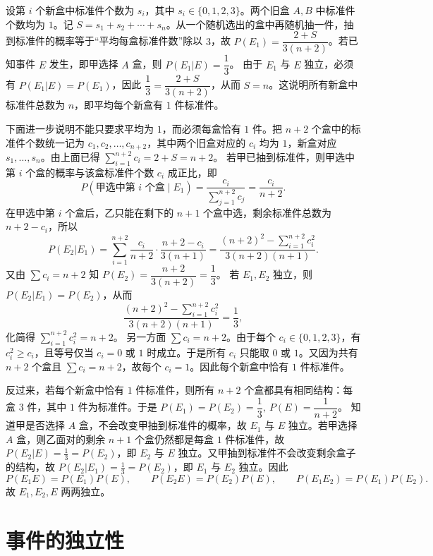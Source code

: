 \documentclass[lang=cn,11pt]{elegantbook}
\begin{document}
\begin{solution}
设第 \(i\) 个新盒中标准件个数为 \(s_i\)，其中 \(s_i\in\{0,1,2,3\}\)。两个旧盒 \(A,B\) 中标准件个数均为 \(1\)。记 \(S=s_1+s_2+\cdots+s_n\)。从一个随机选出的盒中再随机抽一件，抽到标准件的概率等于“平均每盒标准件数”除以 \(3\)，故 \(P(E_1)=\dfrac{2+S}{3(n+2)}\)。若已知事件 \(E\) 发生，即甲选择 \(A\) 盒，则 \(P(E_1|E)=\dfrac13\)。
由于 \(E_1\) 与 \(E\) 独立，必须有 \(P(E_1|E)=P(E_1)\)，因此
 \(\dfrac13=\dfrac{2+S}{3(n+2)}\)，从而 \(S=n\)。这说明所有新盒中标准件总数为 \(n\)，即平均每个新盒有 \(1\) 件标准件。

下面进一步说明不能只要求平均为 \(1\)，而必须每盒恰有 \(1\) 件。把 \(n+2\) 个盒中的标准件个数统一记为 \(c_1,c_2,\dots,c_{n+2}\)，其中两个旧盒对应的 \(c_i\) 均为 \(1\)，新盒对应 \(s_1,\dots,s_n\)。由上面已得 \(\sum_{i=1}^{n+2}c_i=2+S=n+2\)。
若甲已抽到标准件，则甲选中第 \(i\) 个盒的概率与该盒标准件个数 \(c_i\) 成正比，即
\[
P(\text{甲选中第 }i\text{ 个盒}\mid E_1)
=\frac{c_i}{\sum_{j=1}^{n+2}c_j}
=\frac{c_i}{n+2}.
\]
在甲选中第 \(i\) 个盒后，乙只能在剩下的 \(n+1\) 个盒中选，剩余标准件总数为 \(n+2-c_i\)，所以
\[
P(E_2|E_1)
=\sum_{i=1}^{n+2}\frac{c_i}{n+2}\cdot
\frac{n+2-c_i}{3(n+1)}
=\frac{(n+2)^2-\sum_{i=1}^{n+2}c_i^2}{3(n+2)(n+1)}.
\]
又由 \(\sum c_i=n+2\) 知 \(P(E_2)=\dfrac{n+2}{3(n+2)}=\dfrac13\)。
若 \(E_1,E_2\) 独立，则 \(P(E_2|E_1)=P(E_2)\)，从而
\[
\frac{(n+2)^2-\sum_{i=1}^{n+2}c_i^2}{3(n+2)(n+1)}
=\frac13,
\]
化简得 \(\sum_{i=1}^{n+2}c_i^2=n+2\)。
另一方面 \(\sum c_i=n+2\)。由于每个 \(c_i\in\{0,1,2,3\}\)，有 \(c_i^2\ge c_i\)，且等号仅当 \(c_i=0\) 或 \(1\) 时成立。于是所有 \(c_i\) 只能取 \(0\) 或 \(1\)。又因为共有 \(n+2\) 个盒且 \(\sum c_i=n+2\)，故每个 \(c_i=1\)。因此每个新盒中恰有 \(1\) 件标准件。

反过来，若每个新盒中恰有 \(1\) 件标准件，则所有 \(n+2\) 个盒都具有相同结构：每盒 \(3\) 件，其中 \(1\) 件为标准件。于是 \(P(E_1)=P(E_2)=\dfrac13,\ P(E)=\dfrac1{n+2}\)。
知道甲是否选择 \(A\) 盒，不会改变甲抽到标准件的概率，故 \(E_1\) 与 \(E\) 独立。若甲选择 \(A\) 盒，则乙面对的剩余 \(n+1\) 个盒仍然都是每盒 \(1\) 件标准件，故 \(P(E_2|E)=\frac13=P(E_2)\)，即 \(E_2\) 与 \(E\) 独立。又甲抽到标准件不会改变剩余盒子的结构，故 \(P(E_2|E_1)=\frac13=P(E_2)\)，即 \(E_1\) 与 \(E_2\) 独立。因此
\[
P(E_1E)=P(E_1)P(E),\qquad
P(E_2E)=P(E_2)P(E),\qquad
P(E_1E_2)=P(E_1)P(E_2).
\]
故 \(E_1,E_2,E\) 两两独立。
\end{solution}


\section{事件的独立性}
\end{document}
